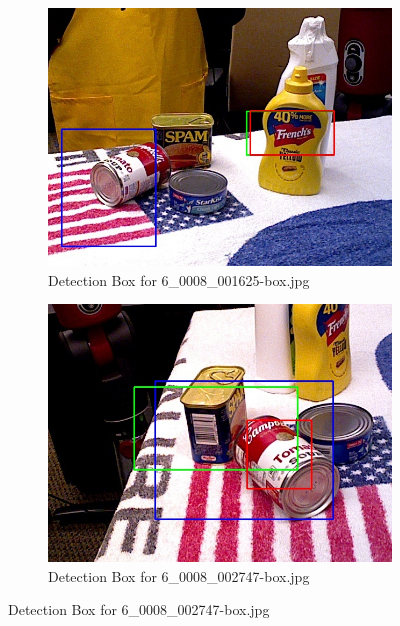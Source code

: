 \documentclass[10.5pt,a4paper]{article}
\begin{document}
    \clearpage
    
    \begin{figure}
    \begin{subfigure}{0.45\textwidth}
        \centering
        \includegraphics[width=\textwidth]{img/6_0008_001625-box.jpg}
        \caption{Detection Box for 6\_0008\_001625-box.jpg}
        \label{fig:img13}
    \end{subfigure}
    \hfill
    \begin{subfigure}{0.45\textwidth}
        \centering
        \includegraphics[width=\textwidth]{img/6_0008_002747-box.jpg}
        \caption{Detection Box for 6\_0008\_002747-box.jpg}
        \label{fig:img14}
    \end{subfigure}


\end{figure}
\end{document}
